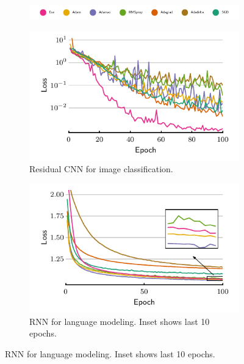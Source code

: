 \documentclass[preview,varwidth=7in,border=0mm]{standalone}
\begin{document}
\begin{figure}
    \centering
    \begin{subfigure}[t]{\textwidth}
        \centering
        \includegraphics[width=\textwidth]{optslegend.pdf}
    \end{subfigure}

    \hfill%
    \begin{subfigure}[t]{0.5\textwidth}
        \centering
        \includegraphics[width=\linewidth]{resnet.pdf}
        \caption{Residual CNN for image classification.}
    \end{subfigure}%
    \begin{subfigure}[t]{0.5\textwidth}
        \centering
        \includegraphics[width=\linewidth]{ptb.pdf}
        \caption{RNN for language modeling. Inset shows last 10 epochs.}
    \end{subfigure}
    \hfill%
\end{figure}
\end{document}
